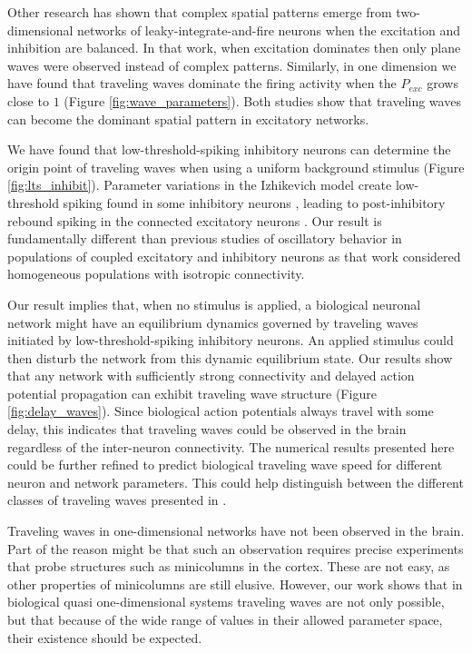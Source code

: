 Other research \citep{keane2015} has shown that complex spatial patterns emerge from two-dimensional networks of leaky-integrate-and-fire neurons when the excitation and inhibition are balanced.
In that work, when excitation dominates then only plane waves were observed instead of complex patterns.
Similarly, in one dimension we have found that traveling waves dominate the firing activity when the $P_{exc}$ grows close to $1$ (Figure \ref{fig:wave_parameters}).
Both studies show that traveling waves can become the dominant spatial pattern in excitatory networks.

We have found that low-threshold-spiking inhibitory neurons can determine the origin point of traveling waves when using a uniform background stimulus (Figure \ref{fig:lts_inhibit}).
Parameter variations in the Izhikevich model \citep{izhikevich2003} create low-threshold spiking found in some inhibitory neurons \citep{gibson2009}\citep{hayut2011}, leading to post-inhibitory rebound spiking in the connected excitatory neurons \citep{ascoli2010}.
Our result is fundamentally different than previous studies of oscillatory behavior in populations of coupled excitatory and inhibitory neurons \citep{Golomb1996}\citep{Golomb1999} as that work considered homogeneous populations with isotropic connectivity.

Our result implies that, when no stimulus is applied, a biological neuronal network might have an equilibrium dynamics governed by traveling waves initiated by low-threshold-spiking inhibitory neurons.
An applied stimulus could then disturb the network from this dynamic equilibrium state.
Our results show  that any network with sufficiently strong connectivity and delayed action potential propagation can exhibit traveling wave structure (Figure \ref{fig:delay_waves}).
Since biological action potentials always travel with some delay, this indicates that traveling waves could be observed in the brain regardless of the inter-neuron connectivity.
The numerical results presented here could be further refined to predict biological traveling wave speed for different neuron and network parameters.
This could help distinguish between the different classes of traveling waves presented in \citep{ermentrout2001}.

Traveling waves in one-dimensional networks have not been observed in the brain. 
Part of the reason might be that such an observation requires precise experiments that probe structures such as minicolumns in the cortex. 
These are not easy, as other properties of minicolumns are still elusive. 
However, our work shows that in biological quasi one-dimensional systems  traveling waves are not only possible, but that because of the wide range of values in their allowed parameter space, their existence should be expected.

